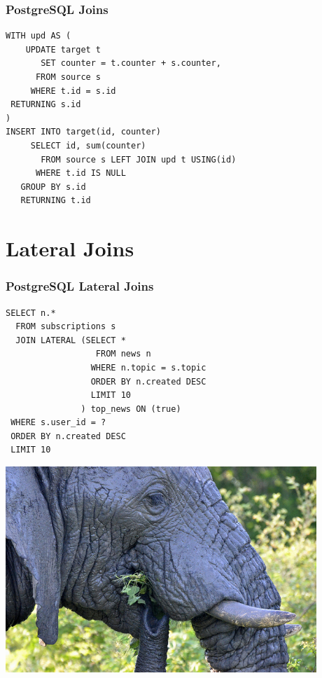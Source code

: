 \documentclass{beamer}
\begin{document}
\begin{frame}[fragile]
  \frametitle{PostgreSQL Joins}

  \begin{verbatim}
WITH upd AS (
    UPDATE target t
       SET counter = t.counter + s.counter,
      FROM source s
     WHERE t.id = s.id
 RETURNING s.id
)
INSERT INTO target(id, counter)
     SELECT id, sum(counter)
       FROM source s LEFT JOIN upd t USING(id)
      WHERE t.id IS NULL
   GROUP BY s.id
   RETURNING t.id
  \end{verbatim}
\end{frame}

\section{Lateral Joins}

\begin{frame}[fragile]
  \frametitle{PostgreSQL Lateral Joins}

  \vfill
  
  \begin{verbatim}
SELECT n.*
  FROM subscriptions s
  JOIN LATERAL (SELECT *
                  FROM news n
                 WHERE n.topic = s.topic
                 ORDER BY n.created DESC
                 LIMIT 10
               ) top_news ON (true)
 WHERE s.user_id = ?
 ORDER BY n.created DESC
 LIMIT 10
  \end{verbatim}
\end{frame}
 
\begin{frame}
  \begin{center}
    \includegraphics[height=21em]{postgresql-mongodb.jpg}
  \end{center}
\end{frame}
\end{document}
